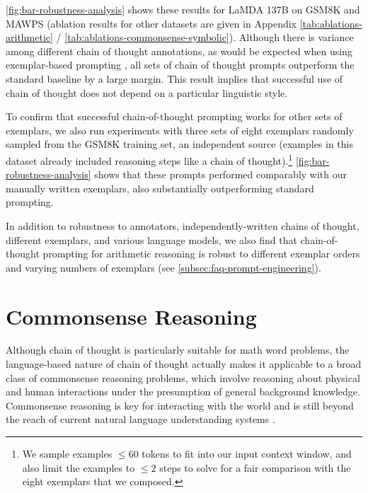 \cref{fig:bar-robustness-analysis} shows these results for LaMDA 137B on GSM8K and MAWPS (ablation results for other datasets are given in Appendix \cref{tab:ablations-arithmetic} / \cref{tab:ablations-commonsense-symbolic}).
Although there is variance among different chain of thought annotations, as would be expected when using exemplar-based prompting \citep{le-scao-rush-2021-many,reynolds2021prompt,zhao2021calibrate}, all sets of chain of thought prompts outperform the standard baseline by a large margin. This result implies that successful use of chain of thought does not depend on a particular linguistic style.

To confirm that successful chain-of-thought prompting works for other sets of exemplars, we also run experiments with three sets of eight exemplars randomly sampled from the GSM8K training set, an independent source (examples in this dataset already included reasoning steps like a chain of thought).\footnote{We sample examples $\leq 60$ tokens to fit into our input context window, and also limit the examples to $\leq 2$ steps to solve for a fair comparison with the eight exemplars that we composed.}
\cref{fig:bar-robustness-analysis} shows that these prompts performed comparably with our manually written exemplars, also substantially outperforming standard prompting.

In addition to robustness to annotators, independently-written chains of thought, different exemplars, and various language models, we also find that chain-of-thought prompting for arithmetic reasoning is robust to different exemplar orders and varying numbers of exemplars (see \cref{subsec:faq-prompt-engineering}).

\section{Commonsense Reasoning}\label{sec:commonsense-reasoning}

Although chain of thought is particularly suitable for math word problems, the language-based nature of chain of thought actually makes it applicable to a broad class of commonsense reasoning problems, which involve reasoning about physical and human interactions under the presumption of general background knowledge. Commonsense reasoning is key for interacting with the world and is still beyond the reach of current natural language understanding systems \citep{talmor2022commonsenseqa}.

